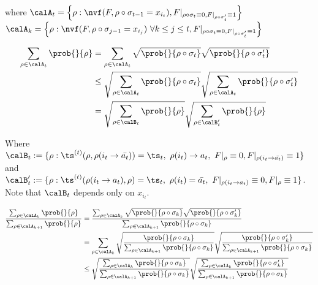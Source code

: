 where 
$\calA_t = \left\{                        
            \rho: \nvf(F,\rho \circ \sigma_{t-1} = x_{i_t}), F|_{\rho \circ \sigma_t \equiv 0 , F|_{\rho \circ \sigma_t'} \equiv 1}    
            \right\}$   \\

$\calA_k = \left\{                        
            \rho: \nvf(F,\rho \circ \sigma_{j-1} = x_{i_j})\ \forall k \leq j \leq t , F|_{\rho \circ \sigma_t \equiv 0 , F|_{\rho \circ \sigma_t'} \equiv 1}    
            \right\}$

  \begin{align*}
        \sum_{\rho \in \calA_t} \prob{}{\rho} 
        &= \sum_{\rho \in \calA_t} \sqrt{\prob{}{\rho \circ \sigma_t}}\sqrt{\prob{}{\rho \circ \sigma_t'}}  \\
        &\leq \sqrt{\sum_{\rho \in \calA_t}\prob{}{\rho \circ \sigma_t}}\sqrt{\sum_{\rho \in \calA_t}\prob{}{\rho \circ \sigma_t'}}\\
        &= \sqrt{\sum_{\rho \in \calB_t}\prob{}{\rho }}\sqrt{\sum_{\rho \in \calB_t'}\prob{}{\rho}}
  \end{align*}


Where $\calB_t:= \{
    \rho: \ts^{(t)}(\rho, \rho(i_t \to \bar{a_t}))= \ts_t,\ \rho(i_t) \to a_t,\ 
    F|_{\rho} \equiv 0,
    F|_{\rho (i_t \to \bar{a_t})} \equiv 1  
     \}$ and \\
     $\calB_t':= \{
    \rho: \ts^{(t)}(\rho(i_t \to a_t), \rho)= \ts_t,\ 
    \rho(i_t) = \bar{a_t},\     
    F|_{\rho(i_t \to a_t)} \equiv 0,
    F|_{\rho } \equiv 1  
     \}$.
Note that $\calB_t$ depends only on $x_{i_t}$.

    \begin{align*}
        \frac{\sum_{\rho \in \calA_k}\prob{}{\rho}}{\sum_{\rho \in \calA_{k+1}}\prob{}{\rho}} 
        &=\frac{\sum_{\rho \in \calA_k} \sqrt{\prob{}{\rho\circ \sigma_k}} \sqrt{\prob{}{\rho\circ \sigma_k'}}}{\sum_{\rho \in \calA_{k+1}}\prob{}{\rho\circ \sigma_k}}\\
        &= \sum_{\rho \in \calA_k} \sqrt{\frac{\prob{}{\rho\circ \sigma_k}}{\sum_{\rho \in \calA_{k+1}}\prob{}{\rho\circ \sigma_k}}} \sqrt{\frac{\prob{}{\rho\circ \sigma_k'}}{\sum_{\rho \in \calA_{k+1}}\prob{}{\rho\circ \sigma_k}}} \\
        &\leq \sqrt{\frac{\sum_{\rho \in \calA_k}\prob{}{\rho\circ \sigma_k}}  {\sum_{\rho \in \calA_{k+1}}\prob{}{\rho\circ \sigma_k}}} \sqrt{\frac{\sum_{\rho \in \calA_k}\prob{}{\rho\circ \sigma_k'}}{\sum_{\rho \in \calA_{k+1}}\prob{}{\rho\circ \sigma_k}}}\\        
    \end{align*}

